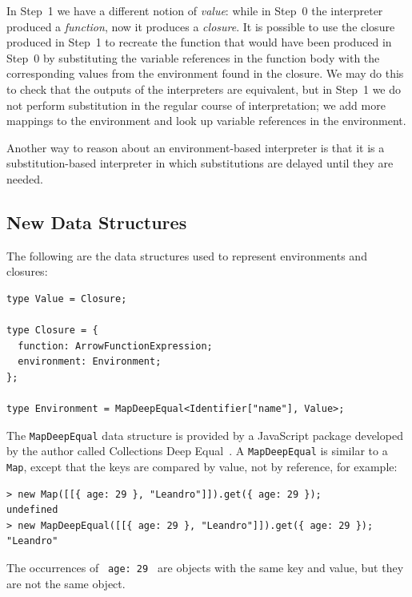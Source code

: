\documentclass[12pt, oneside]{book}
\begin{document}
In Step~1 we have a different notion of \emph{value}: while in Step~0 the interpreter produced a \emph{function}, now it produces a \emph{closure}. It is possible to use the closure produced in Step~1 to recreate the function that would have been produced in Step~0 by substituting the variable references in the function body with the corresponding values from the environment found in the closure. We may do this to check that the outputs of the interpreters are equivalent, but in Step~1 we do not perform substitution in the regular course of interpretation; we add more mappings to the environment and look up variable references in the environment.

\begin{mdframed}[frametitle = {Alternative Argument}]
Another way to reason about an environment-based interpreter is that it is a substitution-based interpreter in which substitutions are delayed until they are needed.
\end{mdframed}

\subsection{New Data Structures}

The following are the data structures used to represent environments and closures:

\begin{verbatim}
type Value = Closure;

type Closure = {
  function: ArrowFunctionExpression;
  environment: Environment;
};

type Environment = MapDeepEqual<Identifier["name"], Value>;
\end{verbatim}

\begin{mdframed}[frametitle = {Implementation Details}]
The \texttt{MapDeepEqual} data structure is provided by a JavaScript package developed by the author called Collections Deep Equal~\cite{collections-deep-equal}. A \texttt{MapDeepEqual} is similar to a \texttt{Map}, except that the keys are compared by value, not by reference, for example:

\begin{verbatim}
> new Map([[{ age: 29 }, "Leandro"]]).get({ age: 29 });
undefined
> new MapDeepEqual([[{ age: 29 }, "Leandro"]]).get({ age: 29 });
"Leandro"
\end{verbatim}

The occurrences of \texttt{{ age: 29 }} are objects with the same key and value, but they are not the same object.
\end{mdframed}
\end{document}

